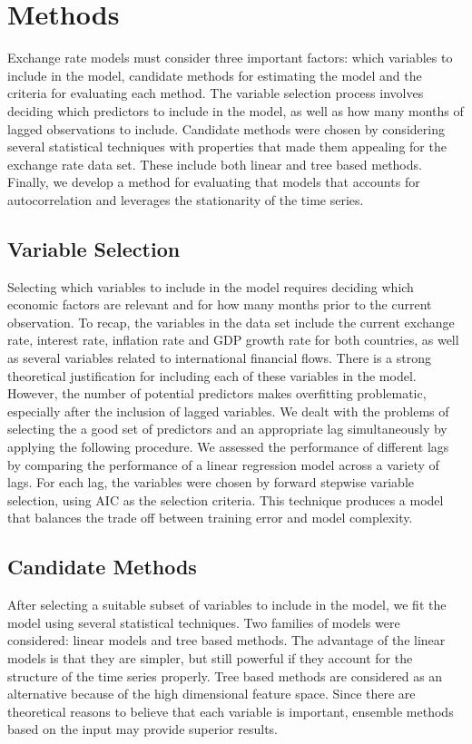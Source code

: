 \documentclass{sig-alternate-05-2015}
\begin{document}
\section{Methods}
Exchange rate models must consider three important factors: which variables to include in the model, candidate methods for estimating the model and the criteria for evaluating each method. The variable selection process involves deciding which predictors to include in the model, as well as how many months of lagged observations to include. Candidate methods were chosen by considering several statistical techniques with properties that made them appealing for the exchange rate data set. These include both linear and tree based methods. Finally, we develop a method for evaluating that models that accounts for autocorrelation and leverages the stationarity of the time series.

\subsection{Variable Selection}
Selecting which variables to include in the model requires deciding which economic factors are relevant and for how many months prior to the current observation. To recap, the variables in the data set include the current exchange rate, interest rate, inflation rate and GDP growth rate for both countries, as well as several variables related to international financial flows. There is a strong theoretical justification for including each of these variables in the model. However, the number of potential predictors makes overfitting problematic, especially after the inclusion of lagged variables. We dealt with the problems of selecting the a good set of predictors and an appropriate lag simultaneously by applying the following procedure. We assessed the performance of different lags by comparing the performance of a linear regression model across a variety of lags. For each lag, the variables were chosen by forward stepwise variable selection, using AIC as the selection criteria. This technique produces a model that balances the trade off between training error and model complexity.

\subsection{Candidate Methods}
After selecting a suitable subset of variables to include in the model, we fit the model using several statistical techniques. Two families of models were considered: linear models and tree based methods. The advantage of the linear models is that they are simpler, but still powerful if they account for the structure of the time series properly. Tree based methods are considered as an alternative because of the high dimensional feature space. Since there are theoretical reasons to believe that each variable is important, ensemble methods based on the input may provide superior results.
\end{document}
